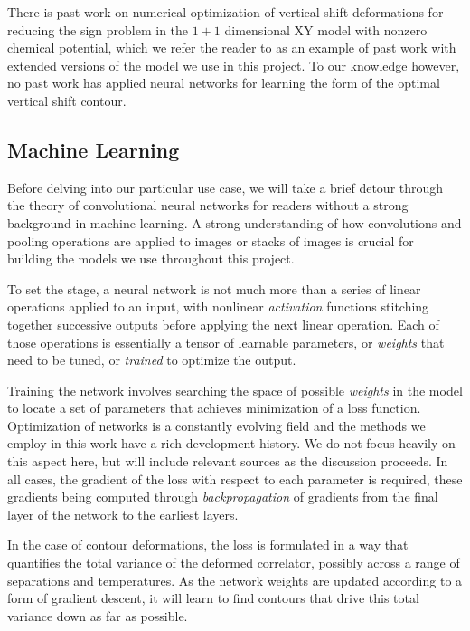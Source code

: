 \documentclass[12pt]{article}
\begin{document}
There is past work \cite{Giordano_2022} on numerical optimization of vertical shift deformations for reducing the sign problem in the $1+1$ dimensional XY model with 
nonzero chemical potential, which we refer the reader to as an example of past work with extended versions of the model we use in this project. To our knowledge
however, no past work has applied neural networks for learning the form of the optimal vertical shift contour.

\subsection{Machine Learning}

Before delving into our particular use case, we will take a brief detour through the theory of convolutional neural networks for readers
without a strong background in machine learning. A strong understanding of how convolutions and pooling operations are applied to images or stacks of images is crucial
for building the models we use throughout this project.  

To set the stage, a neural network is not much more than a series of linear operations applied to an input, with nonlinear \textit{activation}
functions stitching together successive outputs before applying the next linear operation. Each of those operations is essentially a tensor of learnable parameters, or \textit{weights} that need
to be tuned, or \textit{trained} to optimize the output.

Training the network involves searching the space of possible \textit{weights} in the model to locate a set of parameters that achieves minimization
of a loss function. Optimization of networks is a constantly evolving field and the methods we employ in this work have a rich
development history. We do not focus heavily on this aspect here, but will include relevant sources as the discussion proceeds. In all cases,
the gradient of the loss with respect to each parameter is required, these gradients being computed through \textit{backpropagation} of gradients from the
final layer of the network to the earliest layers.

In the case of contour deformations, the loss is formulated in a way that quantifies the total variance of the deformed correlator, possibly across a 
range of separations and temperatures. As the network weights are updated according to a form of gradient descent, it will learn to find contours that drive
this total variance down as far as possible. 
\end{document}
